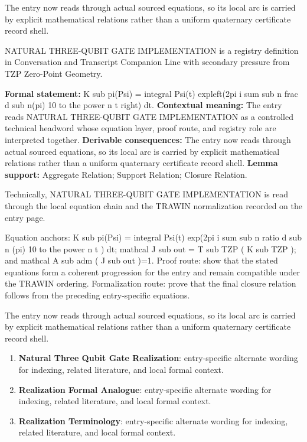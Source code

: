 The entry now reads through actual sourced equations, so its local arc is carried by explicit mathematical relations rather than a uniform quaternary certificate record shell.
\clearpage


\begingroup\small
{}
NATURAL THREE-QUBIT GATE IMPLEMENTATION is a registry definition in Conversation and Transcript Companion Line with secondary pressure from TZP Zero-Point Geometry.

\begingroup\footnotesize\setlength{\emergencystretch}{3em}\sloppy
\textbf{Formal statement:} K sub pi(Psi) = integral Psi(t) expleft(2pi i sum sub n frac d sub n(pi) 10 to the power n t right) dt. \textbf{Contextual meaning:} The entry reads NATURAL THREE-QUBIT GATE IMPLEMENTATION as a controlled technical headword whose equation layer, proof route, and registry role are interpreted together. \textbf{Derivable consequences:} The entry now reads through actual sourced equations, so its local arc is carried by explicit mathematical relations rather than a uniform quaternary certificate record shell. \textbf{Lemma support:} Aggregate Relation; Support Relation; Closure Relation.\par
\endgroup

Technically, NATURAL THREE-QUBIT GATE IMPLEMENTATION is read through the local equation chain and the TRAWIN normalization recorded on the entry page.

Equation anchors: K sub pi(Psi) = integral Psi(t) exp(2pi i sum sub n ratio d sub n (pi) 10 to the power n t ) dt; mathcal J sub out = T sub TZP ( K sub TZP ); and mathcal A sub adm ( J sub out )=1. Proof route: show that the stated equations form a coherent progression for the entry and remain compatible under the TRAWIN ordering. Formalization route: prove that the final closure relation follows from the preceding entry-specific equations.

The entry now reads through actual sourced equations, so its local arc is carried by explicit mathematical relations rather than a uniform quaternary certificate record shell.
\endgroup

\begin{enumerate}[leftmargin=1.6em,itemsep=6pt,topsep=4pt]
\item \textbf{Natural Three Qubit Gate Realization}: entry-specific alternate wording for indexing, related literature, and local formal context.
\item \textbf{Realization Formal Analogue}: entry-specific alternate wording for indexing, related literature, and local formal context.
\item \textbf{Realization Terminology}: entry-specific alternate wording for indexing, related literature, and local formal context.
\end{enumerate}

